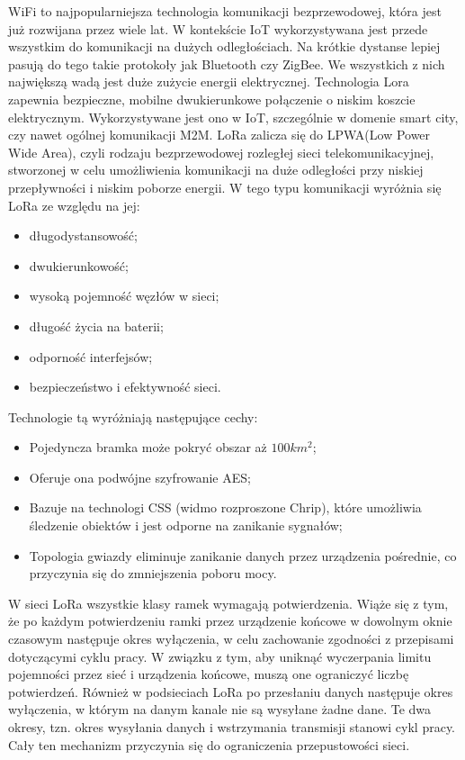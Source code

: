 WiFi to najpopularniejsza technologia komunikacji bezprzewodowej, która jest już rozwijana przez wiele lat. W kontekście IoT wykorzystywana jest przede wszystkim do komunikacji na dużych
odległościach. Na krótkie dystanse lepiej pasują do tego takie protokoły jak Bluetooth czy ZigBee. We wszystkich z nich największą wadą jest duże zużycie energii elektrycznej. Technologia Lora zapewnia bezpieczne, mobilne dwukierunkowe połączenie o niskim koszcie elektrycznym. Wykorzystywane jest ono w IoT, szczególnie w domenie smart city, czy nawet ogólnej komunikacji M2M. LoRa zalicza się do LPWA(Low Power Wide Area), czyli rodzaju bezprzewodowej rozległej sieci telekomunikacyjnej, stworzonej w celu umożliwienia komunikacji na duże odległości przy niskiej przepływności i niskim poborze energii. \cite{LPWA-wiki} W tego typu komunikacji wyróżnia się LoRa ze względu na jej:
\begin{itemize}
  \item długodystansowość;
  \item dwukierunkowość;
  \item wysoką pojemność węzłów w sieci;
  \item długość życia na baterii;
  \item odporność interfejsów;
  \item bezpieczeństwo i efektywność sieci. \cite{LoRa-article}
\end{itemize}


Technologie tą wyróżniają następujące cechy:
\begin{itemize}
  \item Pojedyncza bramka może pokryć obszar aż $100km^2$;
  \item Oferuje ona podwójne szyfrowanie AES;
  \item Bazuje na technologi CSS (widmo rozproszone Chrip), które umożliwia śledzenie obiektów i jest odporne na zanikanie sygnałów;
  \item Topologia gwiazdy eliminuje zanikanie danych przez urządzenia pośrednie, co przyczynia się do zmniejszenia poboru mocy. \cite{LoRa-article}
\end{itemize}


W sieci LoRa wszystkie klasy ramek wymagają potwierdzenia. Wiąże się z tym, że po każdym potwierdzeniu ramki przez urządzenie końcowe w dowolnym oknie czasowym następuje okres wyłączenia, w celu zachowanie zgodności z przepisami dotyczącymi cyklu pracy. W związku z tym, aby uniknąć wyczerpania limitu pojemności przez sieć i urządzenia końcowe, muszą one ograniczyć liczbę potwierdzeń. Również w podsieciach LoRa po przesłaniu danych następuje okres wyłączenia, w którym na danym kanale nie są wysyłane żadne dane. Te dwa okresy, tzn. okres wysyłania danych i wstrzymania transmisji stanowi cykl pracy. Cały ten mechanizm przyczynia się do ograniczenia przepustowości sieci.\cite{LoRa-article}

